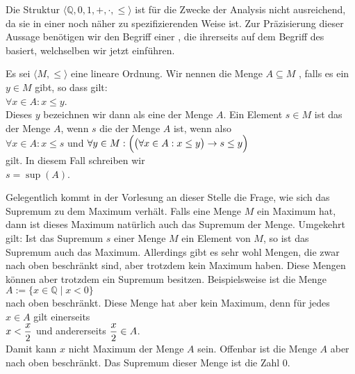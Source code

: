Die Struktur $\langle \mathbb{Q}, 0, 1, +, \cdot, \leq \rangle$ ist  für die Zwecke der Analysis nicht ausreichend,
da sie in einer noch näher zu spezifizierenden Weise  ist.  Zur Präzisierung dieser Aussage
benötigen wir den Begriff einer , die ihrerseits
auf dem Begriff des  basiert, welchselben wir jetzt einführen.


\begin{Definition}[Supremum]
Es sei $\langle M, \leq \rangle$ eine lineare Ordnung.
Wir nennen die Menge $A \subseteq M$  \linebreak
{}, falls es ein
 $y \in M$ gibt, so dass gilt:
\\[0.2cm]
\hspace*{1.3cm}
$\forall x \in A:  x \leq y$.
\\[0.2cm]
Dieses $y$ bezeichnen wir dann als eine  der Menge $A$.
Ein Element $s \in M$ ist das  der Menge $A$, wenn $s$ die 
 der Menge $A$ ist, wenn also 
\\[0.2cm]
\hspace*{1.3cm}
$\forall x \in A: x \leq s$ \quad \mbox{und} \quad
$\forall y \in M: \Bigl(\bigl(\forall x \in A: x \leq y \bigr)\rightarrow s \leq y \Bigr)$
\\[0.2cm]
gilt.  In diesem Fall schreiben wir
\\[0.2cm]
\hspace*{1.3cm}
$s = \sup(A)$.
\edx
\end{Definition}

\remark
Gelegentlich kommt in der Vorlesung an dieser Stelle die Frage, wie sich das Supremum zu dem Maximum verhält.
Falls eine Menge $M$ ein Maximum hat, dann ist dieses Maximum natürlich auch das Supremum der Menge.
Umgekehrt gilt:  Ist das Supremum $s$ einer Menge $M$ ein Element von $M$, so ist das Supremum auch das Maximum.
Allerdings gibt es sehr wohl Mengen, die zwar nach oben beschränkt sind, aber trotzdem kein Maximum haben.
Diese Mengen können aber trotzdem ein Supremum besitzen.
Beispielsweise ist die Menge
\\[0.2cm]
\hspace*{1.3cm}
$A := \{ x \in \mathbb{Q} \mid x < 0 \}$
\\[0.2cm]
nach oben beschränkt. Diese Menge hat aber kein Maximum, denn für jedes $x \in A$ gilt einerseits
\\[0.2cm]
\hspace*{1.3cm}
$\displaystyle x < \frac{x}{2}$ \quad und andererseits \quad $\displaystyle \frac{x}{2} \in A$.
\\[0.2cm]
Damit kann $x$ nicht Maximum der Menge $A$ sein.  Offenbar ist die Menge $A$ aber nach oben beschränkt.  Das Supremum
dieser Menge ist die Zahl $0$.  \eox
\vspace*{0.2cm}

